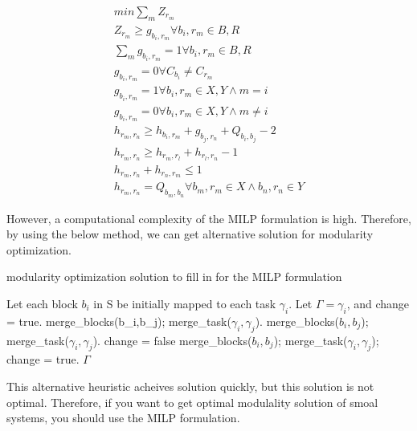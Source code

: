 \documentclass[conference,compsoc]{IEEEtran}
\begin{document}
\begin{eqnarray}
 min \sum_{m} Z_{r_m} \\
 Z_{r_m} \geq g_{b_i,r_m} \forall b_i,r_m \in B,R \\
 \sum_m g_{b_i,r_m} = 1 \forall b_i,r_m \in B,R \\
 g_{b_i,r_m} = 0 \forall C_{b_i} \neq C_{r_m} \\
 g_{b_i,r_m} = 1 \forall b_i,r_m \in X,Y \wedge m = i \\
 g_{b_i,r_m} = 0 \forall b_i,r_m \in X,Y \wedge m \neq i \\
 h_{r_m,r_n} \geq h_{b_i,r_m} + g_{b_j,r_n} + Q_{b_i,b_j} - 2 \\
 h_{r_m,r_n} \geq h_{r_m,r_l} + h_{r_l,r_n} - 1 \\
 h_{r_m,r_n} + h_{r_n,r_m} \leq 1 \\
 h_{r_m,r_n} = Q_{b_m,b_n} \forall b_m,r_m \in X \wedge b_n,r_n \in Y
\end{eqnarray}

 However, a computational complexity of the MILP formulation is high.
Therefore, by using the below method, we can get alternative solution for modularity optimization.   

\begin{algorithm}
\caption{modularity optimization solution to fill in for the MILP formulation}         
\label{alg1}                          
\begin{algorithmic}[1]
\STATE Let each block $b_i$ in S be initially mapped to each task $\gamma_i$.
\STATE Let $\Gamma = {\gamma_i}$, and change = true.
			\STATE merge\_blocks(b\_i,b\_j); merge\_task($\gamma_i,\gamma_j$).
		\ENDIF
	\ENDWHILE
			\STATE merge\_blocks($b_i,b_j$); merge\_task($\gamma_i,\gamma_j$).
		\ENDIF
	\ENDWHILE
	\STATE change = false
		\STATE merge\_blocks($b_i,b_j$); merge\_task($\gamma_i,\gamma_j$); change = true.
	\ENDIF
\ENDWHILE
\RETURN $\Gamma$
\end{algorithmic}
\end{algorithm}

 This alternative heuristic acheives solution quickly, but this solution is not optimal.
Therefore, if you want to get optimal modulality solution of smoal systems, you should use the MILP formulation.
\end{document}
